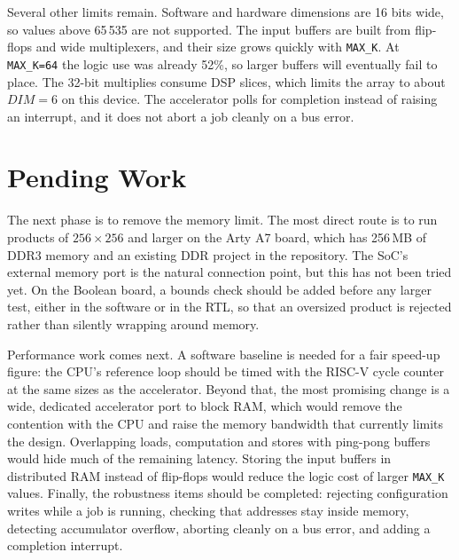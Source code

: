 \documentclass[10.5pt,a4paper]{article}
\begin{document}
Several other limits remain. Software and hardware dimensions are 16 bits wide, so values
above 65\,535 are not supported. The input buffers are built from flip-flops and wide
multiplexers, and their size grows quickly with \texttt{MAX\_K}. At \texttt{MAX\_K=64} the
logic use was already 52\%, so larger buffers will eventually fail to place. The 32-bit
multiplies consume DSP slices, which limits the array to about $DIM=6$ on this device. The
accelerator polls for completion instead of raising an interrupt, and it does not abort a job
cleanly on a bus error.

\section{Pending Work}

The next phase is to remove the memory limit. The most direct route is to run products of
$256\times 256$ and larger on the Arty A7 board, which has 256\,MB of DDR3 memory and an
existing DDR project in the repository. The SoC's external memory port is the natural
connection point, but this has not been tried yet. On the Boolean board, a bounds check should
be added before any larger test, either in the software or in the RTL, so that an oversized
product is rejected rather than silently wrapping around memory.

Performance work comes next. A software baseline is needed for a fair speed-up figure: the
CPU's reference loop should be timed with the RISC-V cycle counter at the same sizes as the
accelerator. Beyond that, the most promising change is a wide, dedicated accelerator port to
block RAM, which would remove the contention with the CPU and raise the memory bandwidth that
currently limits the design. Overlapping loads, computation and stores with ping-pong buffers
would hide much of the remaining latency. Storing the input buffers in distributed RAM instead
of flip-flops would reduce the logic cost of larger \texttt{MAX\_K} values. Finally, the
robustness items should be completed: rejecting configuration writes while a job is running,
checking that addresses stay inside memory, detecting accumulator overflow, aborting cleanly
on a bus error, and adding a completion interrupt.
\end{document}
